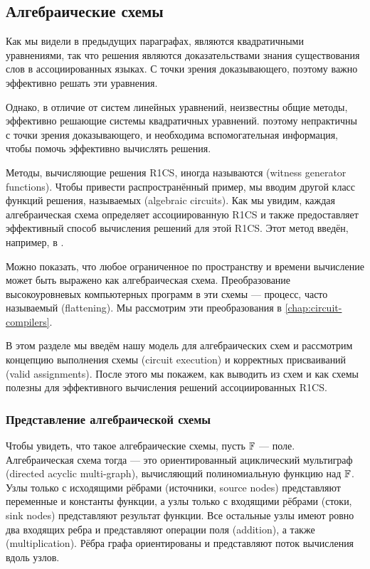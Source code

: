 \subsection{Алгебраические схемы}
\label{sec:circuits} Как мы видели в предыдущих параграфах,  являются квадратичными уравнениями, так что решения являются доказательствами знания существования слов в ассоциированных языках. С точки зрения доказывающего, поэтому важно эффективно решать эти уравнения.

Однако, в отличие от систем линейных уравнений, неизвестны общие методы, эффективно решающие системы квадратичных уравнений.  поэтому непрактичны с точки зрения доказывающего, и необходима вспомогательная информация, чтобы помочь эффективно вычислять решения.

Методы, вычисляющие решения R1CS, иногда называются  (witness generator functions). Чтобы привести распространённый пример, мы вводим другой класс функций решения, называемых  (algebraic circuits). Как мы увидим, каждая алгебраическая схема определяет ассоциированную R1CS и также предоставляет эффективный способ вычисления решений для этой R1CS. Этот метод введён, например, в \cite{sasson-2013}.

Можно показать, что любое ограниченное по пространству и времени вычисление может быть выражено как алгебраическая схема. Преобразование высокоуровневых компьютерных программ в эти схемы — процесс, часто называемый  (flattening). Мы рассмотрим эти преобразования в \chaptname{} \ref{chap:circuit-compilers}.

В этом разделе мы введём нашу модель для алгебраических схем и рассмотрим концепцию выполнения схемы (circuit execution) и корректных присваиваний (valid assignments). После этого мы покажем, как выводить  из схем и как схемы полезны для эффективного вычисления решений ассоциированных R1CS.
\subsubsection{Представление алгебраической схемы} Чтобы увидеть, что такое алгебраические схемы, пусть $\mathbb{F}$ — поле. Алгебраическая схема тогда — это ориентированный ациклический мультиграф (directed acyclic multi-graph), вычисляющий полиномиальную функцию над $\mathbb{F}$. Узлы только с исходящими рёбрами (источники, source nodes) представляют переменные и константы функции, а узлы только с входящими рёбрами (стоки, sink nodes) представляют результат функции. Все остальные узлы имеют ровно два входящих ребра и представляют операции поля  (addition), а также  (multiplication). Рёбра графа ориентированы и представляют поток вычисления вдоль узлов.

